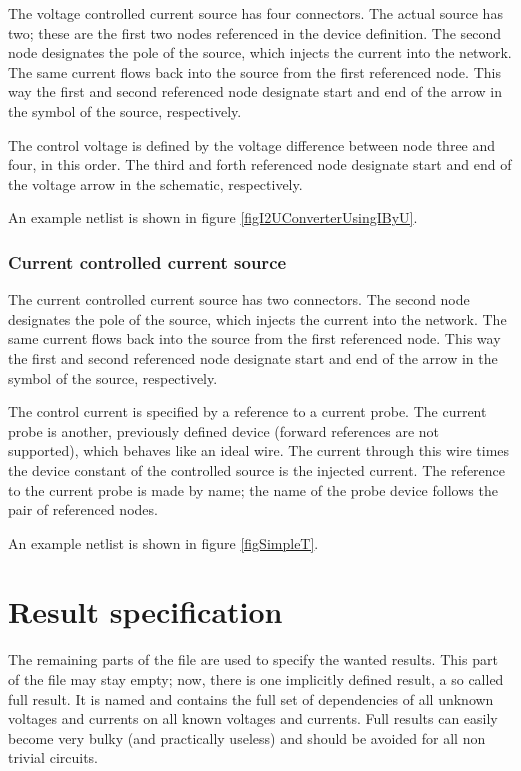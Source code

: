 The voltage controlled current source  has four connectors. The
actual source has two; these are the first two nodes referenced in the
device definition. The second node designates the pole of the source,
which injects the current into the network. The same current flows back
into the source from the first referenced node. This way the first and
second referenced node designate start and end of the arrow in the symbol
of the source, respectively.

The control voltage is defined by the voltage difference between
node three and four, in this order. The third and forth referenced node
designate start and end of the voltage arrow in the schematic,
respectively.

An example netlist is shown in figure \ref{figI2UConverterUsingIByU}.


\subsubsection{Current controlled current source }

The current controlled current source  has two connectors. The
second node designates the pole of the source, which injects the current
into the network. The same current flows back into the source from the
first referenced node. This way the first and second referenced node
designate start and end of the arrow in the symbol of the source,
respectively.

The control current is specified by a reference to a current probe. The
current probe is another, previously defined device (forward references
are not supported), which behaves like an ideal wire. The current through
this wire times the device constant of the controlled source is the
injected current. The reference to the current probe is made by name; the
name of the probe device follows the pair of referenced nodes.

An example netlist is shown in figure \ref{figSimpleT}.


\section{Result specification}
\label{secResultSpec}

The remaining parts of the file are used to specify the wanted results.
This part of the file may stay empty; now, there is one implicitly defined
result, a so called full result. It is named  and
contains the full set of dependencies of all unknown voltages and currents
on all known voltages and currents. Full results can easily become very
bulky (and practically useless) and should be avoided for all non trivial
circuits.

